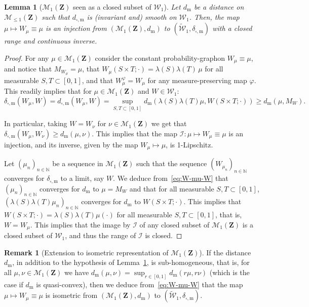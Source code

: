 \documentclass{amsart}
\theoremstyle{plain}
\newtheorem{lemme}[Th]{Lemma}
\theoremstyle{definition}
\newtheorem{rem}[Th]{Remark}
\newcommand{\Space}{\mathbf{Z}}
\newcommand{\cI}{\mathcal{I}}
\newcommand{\Proba}{\mathcal{M}_1(\Space)}
\newcommand{\SubProba}{\mathcal{M}_{\leq1}(\Space)}
\newcommand{\Graphon}{\mathcal{W}_1}
\newcommand{\UGraphon}{\widetilde{\mathcal{W}}_1}
\newcommand{\m}{\mathrm{m}}
\newcommand{\dmeas}{d_\m}
\newcommand{\dcut}{d_{\square,\m}}
\newcommand{\ddcut}{\delta_{\square,\m}}
\newcommand{\N}{\mathbb{N}}
\begin{document}
\begin{lemme}[$\Proba$ seen as a closed subset of $\Graphon$]
	\label{constant_graphons_closed}
  Let $\dmeas$ be a distance on  $\SubProba$ such that $\dcut$  is
  (invariant and) smooth  on  $\Graphon$. Then, the
  map $\mu \mapsto W_\mu \equiv \mu $ is an  injection from $(\Proba,
  \dmeas)$ to $(\UGraphon, \ddcut)$ 
with a closed range and continuous inverse. 
\end{lemme}


\begin{proof}
  For any $\mu\in \Proba$  consider the constant probability-graphon
  $W_\mu\equiv     \mu$,     and    notice     that     $M_{W_\mu}=\mu$,
  that $W_\mu(S\times T;  \cdot)=\lambda(S)\lambda(T)\,  \mu$  for  all  measurable
  $S,  T  \subset  [0,1]$,  and that $W_\mu^\varphi=W_\mu$  for  any
  measure-preserving  map   $\varphi$.
  This   readily  implies   that  for
  $\mu\in \Proba$ and $W\in \Graphon$:
 \begin{equation}
    \label{eq:W-mu-W}
   \ddcut(W_\mu, W) = \dcut(W_\mu, W) =\sup_{S, T\subset [0, 1]}
  \dmeas(\lambda(S)\lambda(T) \mu, W(S\times T; \cdot)) \geq  \dmeas(\mu, M_W)  .
 \end{equation}
 
  
In particular, taking $W=W_\nu$ for $\nu\in \Proba$ we get
that $\ddcut(W_\mu, W_\nu)\geq 
  \dmeas( \mu, \nu) $. This implies that 
the map $\cI: \mu \mapsto W_\mu \equiv \mu $ is an injection,
and its inverse, given by the map $W_\mu \mapsto \mu$, is 1-Lipschitz.

\medskip

Let $(\mu_n )_{n\in\N}$ be a sequence in $\Proba$ such that the sequence
$(W_{\mu_n} )_{n\in\N}$ converges for $\ddcut$ to a limit, say
$W$. We deduce from~\eqref{eq:W-mu-W}  that $(\mu_n)_{n\in\N}$ 
converges for $\dmeas$ to $\mu=M_W$ and that for all measurable $S,
T\subset [0,1]$, $(\lambda(S)\lambda(T) \mu_n)_{n\in\N}$ 
converges for $\dmeas$ to $W(S\times T; \cdot)$. This implies that $W(S\times T; \cdot)
=\lambda(S)\lambda(T) \mu(\cdot)$ for all measurable $S,
T\subset [0,1]$, that is,  $W=W_\mu$. This implies that the
image by $\cI$ of any closed subset of $\Proba$ is a closed subset of
$\Graphon$, and thus the 
range of $\cI$ is closed. 
\end{proof}


\begin{rem}[Extension to isometric representation of $\Proba$]
  \label{rem:isometrie}
  If  the   distance  $\dmeas$,   in  addition   to  the   hypothesis  of
  Lemma~\ref{constant_graphons_closed}, is sub-homogeneous,  that is, for
  all         $\mu,        \nu\in         \Proba$        we         have
  $\dmeas(\mu, \nu)=\sup_{r\in  [0, 1]}  \dmeas(r \mu, r\nu)$  
  (which is the case if $\dmeas$ is quasi-convex), 
  then we deduce   from~\eqref{eq:W-mu-W}      that        the        map
  $\mu \mapsto W_\mu  \equiv \mu $ is isometric  from $(\Proba, \dmeas)$
  to $(\UGraphon, \ddcut)$.
\end{rem}
\end{document}
